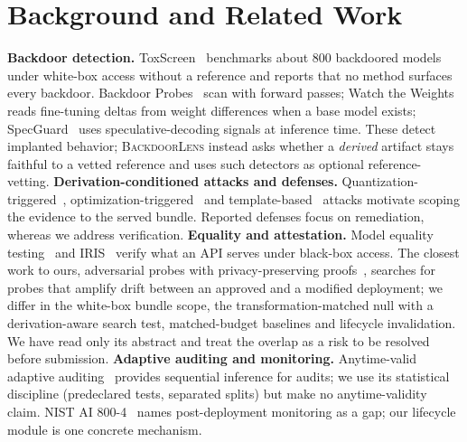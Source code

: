 \IfFileExists{IEEEtran.cls}{\documentclass[conference]{IEEEtran}\newcommand{\hasieee}{1}}{\documentclass[10pt,twocolumn]{article}\newcommand{\hasieee}{0}}
\newcommand{\bl}{\textsc{BackdoorLens}}
\begin{document}
\section{Background and Related Work}
\textbf{Backdoor detection.} ToxScreen~\cite{toxscreen} benchmarks about 800 backdoored models under white-box access without a reference and reports that no method surfaces every backdoor. Backdoor Probes~\cite{bprobes} scan with forward passes; Watch the Weights~\cite{wtw} reads fine-tuning deltas from weight differences when a base model exists; SpecGuard~\cite{specguard} uses speculative-decoding signals at inference time. These detect implanted behavior; \bl{} instead asks whether a \emph{derived} artifact stays faithful to a vetted reference and uses such detectors as optional reference-vetting.
\textbf{Derivation-conditioned attacks and defenses.} Quantization-triggered~\cite{qtb,agentq}, optimization-triggered~\cite{opttrig} and template-based~\cite{chattmpl} attacks motivate scoping the evidence to the served bundle. Reported defenses focus on remediation, whereas we address verification.
\textbf{Equality and attestation.} Model equality testing~\cite{met} and IRIS~\cite{iris} verify what an API serves under black-box access. The closest work to ours, adversarial probes with privacy-preserving proofs~\cite{zkattest}, searches for probes that amplify drift between an approved and a modified deployment; we differ in the white-box bundle scope, the transformation-matched null with a derivation-aware search test, matched-budget baselines and lifecycle invalidation. We have read only its abstract and treat the overlap as a risk to be resolved before submission.
\textbf{Adaptive auditing and monitoring.} Anytime-valid adaptive auditing~\cite{adaptive} provides sequential inference for audits; we use its statistical discipline (predeclared tests, separated splits) but make no anytime-validity claim. NIST AI 800-4~\cite{nist} names post-deployment monitoring as a gap; our lifecycle module is one concrete mechanism.
\end{document}
